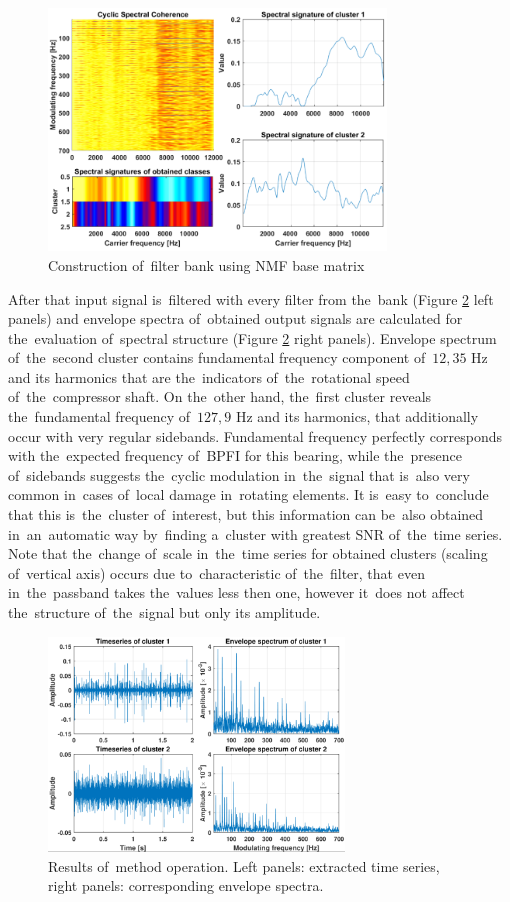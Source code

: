 \begin{figure}[ht!]
\centering
\includegraphics[width=0.8\textwidth]{wykresy/csc_trans}
\caption{Construction of~filter bank using NMF base matrix}
\label{fig:csc_trans}
\end{figure}

After that input signal is~filtered with every filter from the~bank (Figure \ref{fig:csc_out} left panels) and envelope spectra of~obtained output signals are calculated for the~evaluation of~spectral structure (Figure \ref{fig:csc_out} right panels). Envelope spectrum of~the~second cluster contains fundamental frequency component of~$12,35$ Hz and its harmonics that are the~indicators of~the~rotational speed of~the~compressor shaft. On the~other hand, the~first cluster reveals the~fundamental frequency of~$127,9$ Hz and its harmonics, that additionally occur with very regular sidebands. Fundamental frequency perfectly corresponds with the~expected frequency of~BPFI for this bearing, while the~presence of~sidebands suggests the~cyclic modulation in~the~signal that is~also very common in~cases of~local damage in~rotating elements. It is~easy to~conclude that this is~the~cluster of~interest, but this information can be~also obtained in~an~automatic way by~finding a~cluster with greatest SNR of~the~time series. Note that the~change of~scale in~the~time series for obtained clusters (scaling of~vertical axis) occurs due to~characteristic of~the~filter, that even in~the~passband takes the~values less then one, however it~does not affect the~structure of~the~signal but only its amplitude.

\begin{figure}[ht!]
\centering
\includegraphics[width=0.7\textwidth]{wykresy/csc_out}
\caption{Results of~method operation. Left panels: extracted time series, right panels: corresponding envelope spectra.}
\label{fig:csc_out}
\end{figure}

